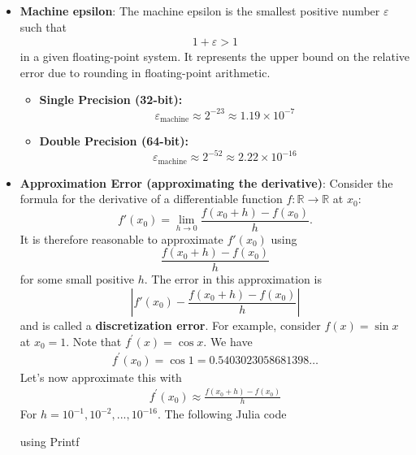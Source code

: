 \documentclass{report}
\begin{document}
\begin{itemize}
        \item \textbf{Machine epsilon}: The machine epsilon is the smallest positive number  $\varepsilon$ such that 
            \begin{align*}
                1+ \varepsilon > 1
            \end{align*}
            in a given floating-point system. It represents the upper bound on the relative error due to rounding in floating-point arithmetic.
            \begin{itemize}
                \item \textbf{Single Precision (32-bit):} 
                    \[
                        \varepsilon_{\text{machine}} \approx 2^{-23} \approx 1.19 \times 10^{-7}
                    \]
                \item \textbf{Double Precision (64-bit):} 
                    \[
                        \varepsilon_{\text{machine}} \approx 2^{-52} \approx 2.22 \times 10^{-16}
                    \]
            \end{itemize}


        \item \textbf{Approximation Error (approximating the derivative)}:
            Consider the formula for the derivative of a differentiable function $f \colon \mathbb{R} \to \mathbb{R}$ at $x_0$:
            $$ f'(x_0) = \lim_{h \to 0} \frac{f(x_0 + h) - f(x_0)}{h}.$$
            It is therefore reasonable to approximate $f'(x_0)$ using
            $$\frac{f(x_0 + h) - f(x_0)}{h}$$
            for some small positive $h$. The error in this approximation is 
            $$\left|f'(x_0) - \frac{f(x_0 + h) - f(x_0)}{h}\right|$$
            and is called a \textbf{discretization error}.
            \bigbreak \noindent 
            For example, consider $f(x) = \sin{x}$ at $x_{0} = 1$. Note that $f^{\prime}(x) = \cos{x} $. We have
            \begin{align*}
                f^{\prime}(x_{0}) = \cos{1} =  0.5403023058681398\ldots
            \end{align*}
            Let's now approximate this with
            \begin{align*}
                f^{\prime}(x_{0}) \approx \frac{f(x_{0} + h) - f(x_{0})}{h}
            \end{align*}
            For $h=10^{-1}, 10^{-2},...,10^{-16} $. The following Julia code
            \bigbreak \noindent 
            \begin{jlcode}
using Printf


\end{jlcode}
\end{itemize}
\end{document}
